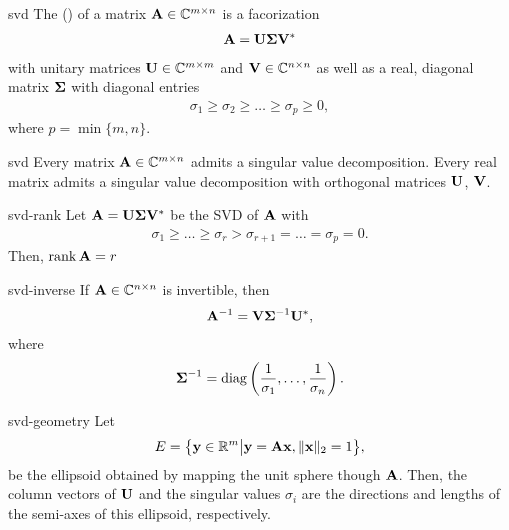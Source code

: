 \begin{Definition}{svd}
  The  () of a matrix $\mathbf A\in\mathbb C^{m\times n}$ is a facorization
  \begin{gather}
    \mathbf A = \mathbf U\boldsymbol\Sigma\mathbf V^*
  \end{gather}
  with unitary matrices $\mathbf U\in\mathbb C^{m\times m}$ and $\mathbf V\in\mathbb C^{n\times n}$ as
  well as a real, diagonal matrix $\boldsymbol\Sigma$ with diagonal entries
  \begin{gather}
    \sigma_1 \ge \sigma_2 \ge \dots \ge \sigma_p \ge 0,
  \end{gather}
  where $p = \min\{m,n\}$.
\end{Definition}

\begin{Theorem}{svd}
  Every matrix $\mathbf A\in\mathbb C^{m\times n}$ admits a singular value
  decomposition. Every real matrix admits a singular value
  decomposition with orthogonal matrices $\mathbf U$, $\mathbf V$.
\end{Theorem}

\begin{Corollary}{svd-rank}
  Let $\mathbf A = \mathbf U\boldsymbol\Sigma\mathbf V^*$ be the SVD of $\mathbf A$ with
  \begin{gather}
    \sigma_1 \ge \dots \ge \sigma_r > \sigma_{r+1} = \dots = \sigma_p = 0.
  \end{gather}
  Then, $\operatorname{rank} \mathbf A = r$
\end{Corollary}

\begin{Corollary}{svd-inverse}
  If $\mathbf A\in\mathbb C^{n\times n}$ is invertible, then
  \begin{gather}
    \mathbf A^{-1} = \mathbf V\boldsymbol\Sigma^{-1}\mathbf U^*,
  \end{gather}
  where
  \begin{gather}
    \boldsymbol\Sigma^{-1} = \operatorname{diag}\left(\frac1{\sigma_1},\dots,\frac1{\sigma_n}\right).
  \end{gather}
\end{Corollary}

\begin{Remark}{svd-geometry}
  Let
  \begin{gather}
    E = \bigl\{ \mathbf y\in \mathbb R^m \big| \mathbf y=\mathbf A\mathbf x, \lVert\mathbf x\rVert_2 = 1 \bigr\},
  \end{gather}
  be the ellipsoid obtained by mapping the unit sphere though
  $\mathbf A$. Then, the column vectors of $\mathbf U$ and the singular values
  $\sigma_i$ are the directions and lengths of the semi-axes of this
  ellipsoid, respectively.
\end{Remark}

